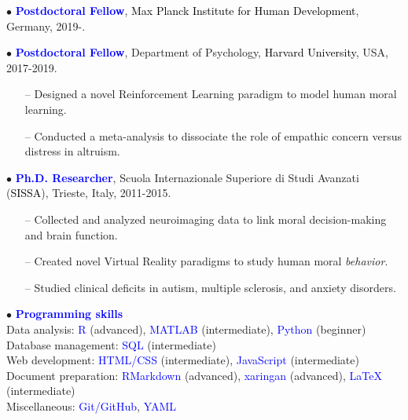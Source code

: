 \documentclass[10pt]{article}
\begin{document}
	\header


	$\bullet$ \textbf{\textcolor{blue}{Postdoctoral Fellow}}, \textcolor{black}{Max Planck Institute for Human Development}, Germany, 2019-.
	\miniskip
	
	$\bullet$ \textbf{\textcolor{blue}{Postdoctoral Fellow}}, Department of Psychology, \textcolor{black}{Harvard University}, USA, 2017-2019.
	\vspace*{-0.09in}
	
	\begin{itemize}
	\itemsep-0.1em 
	\item[--] Designed a novel Reinforcement Learning paradigm to model human moral learning.	
	\item[--] Conducted a meta-analysis to dissociate the role of empathic concern versus distress in altruism.
	\end{itemize}
	\miniskip
	\vspace*{-0.09in}

	$\bullet$ \textbf{\textcolor{blue}{Ph.D. Researcher}}, Scuola Internazionale Superiore di Studi Avanzati (\textcolor{black}{SISSA}), Trieste, Italy, 2011-2015.
	\vspace*{-0.09in}

	\begin{itemize}
	\itemsep-0.1em 
	\item[--] Collected	and analyzed neuroimaging data to link moral decision-making and brain function.
	\item[--] Created novel Virtual Reality paradigms to study human moral \textit{behavior}.
	\item[--] Studied clinical deficits in autism, multiple sclerosis, and anxiety disorders.
	\end{itemize}
    \vspace*{-0.09in}
    
	
	$\bullet$ \textcolor{blue}{\textbf{Programming skills}}\\
	\hspace*{0.1in} Data analysis: \textcolor{blue}{R} (advanced), \textcolor{blue}{MATLAB} (intermediate), \textcolor{blue}{Python} (beginner)\\
	\hspace*{0.1in} Database management: \textcolor{blue}{SQL} (intermediate)\\
	\hspace*{0.1in} Web development: \textcolor{blue}{HTML/CSS} (intermediate), \textcolor{blue}{JavaScript} (intermediate)\\
	\hspace*{0.1in}	Document preparation: \textcolor{blue}{RMarkdown} (advanced), \textcolor{blue}{xaringan} (advanced), \textcolor{blue}{\LaTeX{}} (intermediate)\\
	\hspace*{0.1in} Miscellaneous: \textcolor{blue}{Git/GitHub}, \textcolor{blue}{YAML} 
	\miniskip
	
\end{document}
